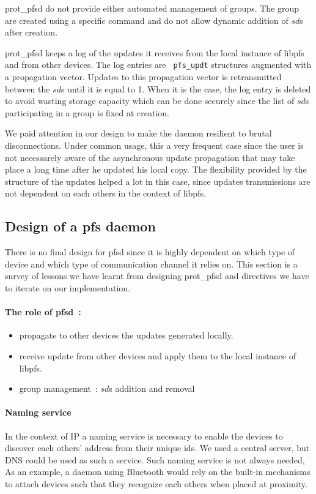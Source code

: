 prot\_pfsd do not provide either automated management of groups. The
group are created using a specific command and do not allow dynamic
addition of $sd$s after creation.

prot\_pfsd keeps a log of the updates it receives from the local
instance of libpfs and from other devices. The log entries are {\tt
  pfs\_updt} structures augmented with a propagation vector. Updates
to this propagation vector is retransmitted between the $sd$s until it
is equal to 1. When it is the case, the log entry is deleted to avoid
wasting storage capacity which can be done securely since the list of
$sd$s participating in a group is fixed at creation.

We paid attention in our design to make the daemon resilient to
brutal disconnections. Under common usage, this a very frequent case
since the user is not necessarely aware of the asynchronous update
propagation that may take place a long time after he updated his local
copy. The flexibility provided by the structure of the updates helped
a lot in this case, since updates transmissions are not dependent on
each others in the context of libpfs.


\subsection {Design of a pfs daemon}
\label {subsec:depfsd}

There is no final design for pfsd since it is highly dependent on
which type of device and which type of communication channel it relies
on. This section is a survey of lessons we have learnt from designing
prot\_pfsd and directives we have to iterate on our implementation.

\paragraph {The role of pfsd~:}
\begin{itemize}
\item propagate to other devices the updates generated locally.
\item receive update from other devices and apply them to the local
  instance of libpfs.
\item group management~: $sd$s addition and removal
\end{itemize}

\paragraph {Naming service}
In the context of IP a naming service is necessary to enable the
devices to discover each others' address from their unique ids. We
used a central server, but DNS could be used as such a service. Such
naming service is not always needed, As an example, a daemon using
Bluetooth would rely on the built-in mechanisms to attach devices such
that they recognize each others when placed at proximity.


